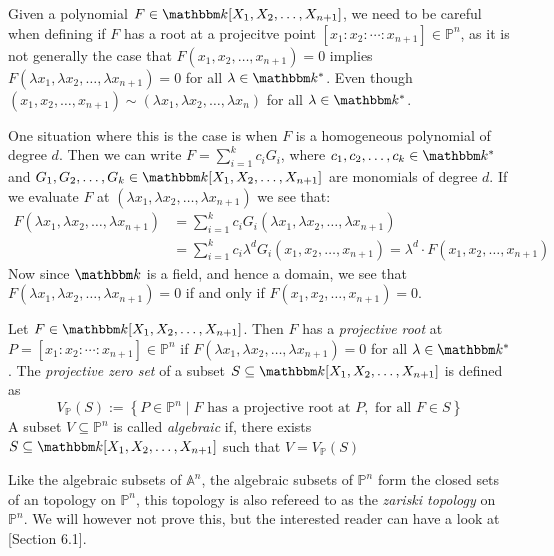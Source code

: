 Given a polynomial $F \in \K[X_1, X_2, \ldots, X_{n + 1}]$, we need to be careful when defining if $F$ has a root at a projecitve point $[x_{1} : x_{2} : \cdots : x_{n + 1}] \in \mathbb{P}^{n}$, as it is not generally the case that $F(x_1, x_2, \ldots, x_{n + 1}) = 0$ implies $F(\lambda x_1, \lambda x_2, \ldots, \lambda x_{n+1}) = 0$ for all $\lambda \in \K^{*}$. Even though $(x_1, x_2, \ldots, x_{n + 1}) \sim (\lambda x_1, \lambda x_2, \ldots, \lambda x_{n})$ for all $\lambda \in \K^{*}$.

One situation where this is the case is when $F$ is a homogeneous polynomial of degree $d$. Then we can write $F = \sum^{k}_{i = 1} c_i G_{i}$, where $c_{1}, c_{2}, \ldots, c_{k} \in \K^{*}$ and $G_{1}, G_{2}, \ldots, G_{k} \in \K[X_1, X_2, \ldots, X_{n + 1}]$ are monomials of degree $d$. If we evaluate $F$ at $(\lambda x_1, \lambda x_2, \ldots, \lambda x_{n + 1})$ we see that:
\begin{align*}
  F(\lambda x_1, \lambda x_2, \ldots, \lambda x_{n + 1}) &= \sum^k_{i = 1} c_i G_i(\lambda x_1, \lambda x_2, \ldots, \lambda x_{n + 1}) \\
                                                         &= \sum^{k}_{i = 1} c_{i} \lambda^{d} G_{i}(x_1, x_2, \ldots, x_{ n+ 1}) = \lambda^{d} \cdot F(x_1, x_2, \ldots, x_{n + 1})
\end{align*}
Now since $\K$ is a field, and hence a domain, we see that $F(\lambda x_1, \lambda x_2, \ldots, \lambda x_{n+1}) = 0$ if and only if $F(x_1, x_2, \ldots, x_{n + 1}) = 0$.

\begin{definition}
  Let $F \in \K[X_1, X_2, \ldots, X_{n + 1}]$. Then $F$ has a \textit{projective root} at $P = [x_{1} : x_{2} : \cdots : x_{n + 1}] \in \mathbb{P}^{n}$ if $F(\lambda x_1, \lambda x_2, \ldots, \lambda x_{n + 1}) = 0$ for all $\lambda \in \K^{*}$. The \textit{projective zero set} of a subset $S \subseteq \K[X_1, X_2, \ldots, X_{n + 1}]$ is defined as
  \begin{equation*}
    V_{\mathbb{P}}(S) := \left\{P \in \mathbb{P}^{n} \mid F \text{ has a projective root at } P, \text{ for all } F \in S \right\}
  \end{equation*}
  A subset $V \subseteq \mathbb{P}^{n}$ is called \textit{algebraic} if, there exists $S \subseteq \K[X_1, X_2, \ldots, X_{n + 1}]$ such that $V = V_{\mathbb{P}}(S)$
\end{definition}

\begin{remark}
  Like the algebraic subsets of $\mathbb{A}^{n}$, the algebraic subsets of $\mathbb{P}^{n}$ form the closed sets of an topology on $\mathbb{P}^{n}$, this topology is also refereed to as the \textit{zariski topology} on $\mathbb{P}^{n}$. We will however not prove this, but the interested reader can have a look at \cite{Fulton}[Section 6.1].
\end{remark}

